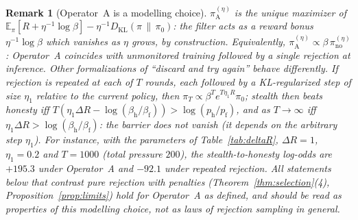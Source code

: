 \documentclass[11pt,a4paper]{article}
\newtheorem{remark}[theorem]{Remark}
\newcommand{\E}{\mathbb{E}}
\newcommand{\DKL}{D_{\mathrm{KL}}}
\begin{document}
\begin{remark}[Operator~A is a modelling choice]\label{rem:modelA}
$\pi_{\mathrm{A}}^{(\eta)}$ is the unique maximizer of $\E_{\pi}[R + \eta^{-1}\log\beta] - \eta^{-1}\DKL(\pi\,\|\,\pi_0)$: the filter acts as a reward bonus $\eta^{-1}\log\beta$ which vanishes as $\eta$ grows, by construction. Equivalently, $\pi_{\mathrm{A}}^{(\eta)} \propto \beta\,\pi_{\mathrm{no}}^{(\eta)}$: Operator~A coincides with unmonitored training followed by a single rejection at inference. Other formalizations of ``discard and try again'' behave differently. If rejection is repeated at each of $T$ rounds, each followed by a KL-regularized step of size $\eta_1$ relative to the current policy, then $\pi_T \propto \beta^T e^{T\eta_1 R}\pi_0$; stealth then beats honesty iff $T(\eta_1\Delta R - \log(\beta_{\mathrm{h}}/\beta_{\mathrm{f}})) > \log(p_{\mathrm{h}}/p_{\mathrm{f}})$, and as $T \to \infty$ iff $\eta_1\Delta R > \log(\beta_{\mathrm{h}}/\beta_{\mathrm{f}})$: the barrier does not vanish (it depends on the arbitrary step $\eta_1$). For instance, with the parameters of Table~\ref{tab:deltaR}, $\Delta R = 1$, $\eta_1 = 0.2$ and $T = 1000$ (total pressure $200$), the stealth-to-honesty log-odds are $+195.3$ under Operator~A and $-92.1$ under repeated rejection. All statements below that contrast pure rejection with penalties (Theorem~\ref{thm:selection}(4), Proposition~\ref{prop:limits}) hold for Operator~A as defined, and should be read as properties of this modelling choice, not as laws of rejection sampling in general.
\end{remark}
\end{document}
